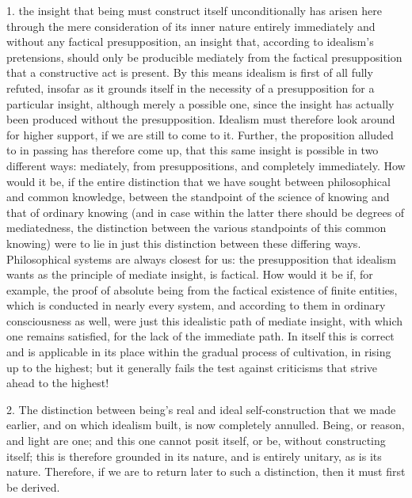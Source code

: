 1. the insight that being must construct itself
unconditionally has arisen here
through the mere consideration
of its inner nature entirely immediately
and without any factical presupposition,
an insight that, according to idealism's pretensions,
should only be producible mediately
from the factical presupposition
that a constructive act is present.
By this means idealism is
first of all fully refuted,
insofar as it grounds itself
in the necessity of a presupposition
for a particular insight,
although merely a possible one,
since the insight has actually
been produced without the presupposition.
Idealism must therefore look
around for higher support,
if we are still to come to it.
Further, the proposition alluded
to in passing has therefore come up,
that this same insight is possible
in two different ways:
mediately, from presuppositions,
and completely immediately.
How would it be,
if the entire distinction that we have sought
between philosophical and common knowledge,
between the standpoint of the science of knowing
and that of ordinary knowing
(and in case within the latter
there should be degrees of mediatedness,
the distinction between the various standpoints
of this common knowing)
were to lie in just
this distinction between these differing ways.
Philosophical systems are always closest for us:
the presupposition that idealism wants
as the principle of mediate insight, is factical.
How would it be if, for example,
the proof of absolute being
from the factical existence of finite entities,
which is conducted in nearly every system,
and according to them in ordinary consciousness as well,
were just this idealistic path of mediate insight,
with which one remains satisfied,
for the lack of the immediate path.
In itself this is correct
and is applicable in its place
within the gradual process of cultivation,
in rising up to the highest;
but it generally fails the test against criticisms
that strive ahead to the highest!

2. The distinction between being's
real and ideal self-construction
that we made earlier,
and on which idealism built,
is now completely annulled.
Being, or reason, and light are one;
and this one cannot posit itself, or be,
without constructing itself;
this is therefore grounded in its nature,
and is entirely unitary, as is its nature.
Therefore, if we are to return
later to such a distinction,
then it must first be derived.

